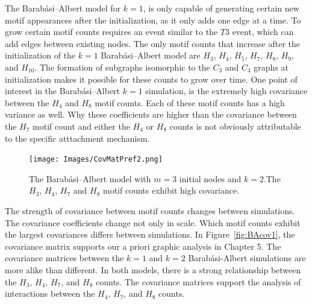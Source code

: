 The Barabási–Albert model for $k=1$, is only capable of generating certain new motif appearances after the initialization, as 
it only adds one edge at a time. To grow certain motif counts requires an event similar to the $T3$ event,
which can add edges between existing nodes. The only motif counts that increase after the initialization
 of the $k=1$ Barabási–Albert model are $H_{3}$, $H_{4}$, $H_{5}$, $H_{7}$, $H_{8}$, $H_{9}$, and $H_{10}$.
 The formation of subgraphs isomorphic to the $C_3$ and $C_4$ graphs at initialization makes it possible for these counts to grow over time.
 One point of interest in the Barabási–Albert $k=1$ simulation, is the extremely high covariance between the $H_4$
 and $H_8$ motif counts. Each of these motif counts has a high variance as well. Why these coefficients are higher than
 the covariance between the $H_7$ motif count and either the $H_4$ or $H_8$ counts is not obviously attributable 
 to the specific atttachment mechanism.




\begin{figure}
    \texttt{[image: Images/CovMatPref2.png]}\
    \centering
    \caption{The Barabási–Albert model with $m=3$ initial nodes and $k=2$.The
    $H_{3}$, $H_{4}$, $H_{7}$ and $H_{8}$ motif counts exhibit high covariance.}
    \label{fig:BA2coeff}
\end{figure}


The 
strength of covariance between motif counts changes between simulations. The covariance coefficients change not only in scale. 
Which motif counts exhibit the largest covariances differs between simulations. In Figure~\ref{fig:BAcov1}, the covariance
matrix supports our a priori graphic analysis in Chapter 5. The covariance matrices between the $k=1$ and $k=2$ Barabási-Albert simulations
 are more alike than different. In both models, there is a strong relationship between the $H_3$, $H_4$, $H_7$, and $H_8$ counts.
 The covariance matrices support the analysis of interactions between the $H_4$, $H_7$, and $H_8$
counts.

